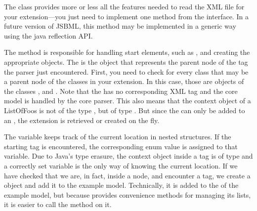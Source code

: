 The class  provides more or less all the 
features needed to read the XML file for your extension---you just need to implement one
method from the  interface. In a future version of JSBML, this method
may be implemented in a generic way using the java reflection API.

The  method is responsible for handling start
elements, such as , and creating the appropriate
objects.  The  is the object that represents the parent
node of the tag the parser just encountered.  First, you need to check for
every class that may be a parent node of the classes in your extension.  In
this case, those are objects of the classes \Model,  and
.  Note that the  has no corresponding XML
tag and the core model is handled by the core parser.  This also
means that the context object of a ListOfFoos is not of the type
, but of type \Model.  But since the 
can only be added to an , the extension is retrieved or
created on the fly.

The  variable keeps track of the current location in
nested structures.  If the  starting tag is encountered,
the corresponding enum value is assigned to that variable.  Due to Java's
type erasure, the context object inside a  tag is of type
 and a correctly set  variable is the only
way of knowing the current location.  If we have checked that we are, in fact,
inside a  node, and encounter a  tag, we create a
 object and add it to the example model.  Technically, it is
added to the  of the example model, but because
 provides convenience methods for managing its lists, it
is easier to call the  method on it.


